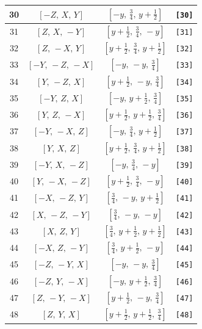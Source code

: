 \documentclass[fleqn,8pt]{jsarticle}
\begin{document}
\begin{longtable}{cccc}
30 & $\left[ - Z,\, X,\, Y \right]$ & $\left[ - y,\, \frac{3}{4},\, y + \frac{1}{2} \right]$ & {\tt [30]} \\ \hline
31 & $\left[ Z,\, X,\, - Y \right]$ & $\left[ y + \frac{1}{2},\, \frac{3}{4},\, - y \right]$ & {\tt [31]} \\ \hline
32 & $\left[ Z,\, - X,\, Y \right]$ & $\left[ y + \frac{1}{2},\, \frac{3}{4},\, y + \frac{1}{2} \right]$ & {\tt [32]} \\ \hline
33 & $\left[ - Y,\, - Z,\, - X \right]$ & $\left[ - y,\, - y,\, \frac{3}{4} \right]$ & {\tt [33]} \\ \hline
34 & $\left[ Y,\, - Z,\, X \right]$ & $\left[ y + \frac{1}{2},\, - y,\, \frac{3}{4} \right]$ & {\tt [34]} \\ \hline
35 & $\left[ - Y,\, Z,\, X \right]$ & $\left[ - y,\, y + \frac{1}{2},\, \frac{3}{4} \right]$ & {\tt [35]} \\ \hline
36 & $\left[ Y,\, Z,\, - X \right]$ & $\left[ y + \frac{1}{2},\, y + \frac{1}{2},\, \frac{3}{4} \right]$ & {\tt [36]} \\ \hline
37 & $\left[ - Y,\, - X,\, Z \right]$ & $\left[ - y,\, \frac{3}{4},\, y + \frac{1}{2} \right]$ & {\tt [37]} \\ \hline
38 & $\left[ Y,\, X,\, Z \right]$ & $\left[ y + \frac{1}{2},\, \frac{3}{4},\, y + \frac{1}{2} \right]$ & {\tt [38]} \\ \hline
39 & $\left[ - Y,\, X,\, - Z \right]$ & $\left[ - y,\, \frac{3}{4},\, - y \right]$ & {\tt [39]} \\ \hline
40 & $\left[ Y,\, - X,\, - Z \right]$ & $\left[ y + \frac{1}{2},\, \frac{3}{4},\, - y \right]$ & {\tt [40]} \\ \hline
41 & $\left[ - X,\, - Z,\, Y \right]$ & $\left[ \frac{3}{4},\, - y,\, y + \frac{1}{2} \right]$ & {\tt [41]} \\ \hline
42 & $\left[ X,\, - Z,\, - Y \right]$ & $\left[ \frac{3}{4},\, - y,\, - y \right]$ & {\tt [42]} \\ \hline
43 & $\left[ X,\, Z,\, Y \right]$ & $\left[ \frac{3}{4},\, y + \frac{1}{2},\, y + \frac{1}{2} \right]$ & {\tt [43]} \\ \hline
44 & $\left[ - X,\, Z,\, - Y \right]$ & $\left[ \frac{3}{4},\, y + \frac{1}{2},\, - y \right]$ & {\tt [44]} \\ \hline
45 & $\left[ - Z,\, - Y,\, X \right]$ & $\left[ - y,\, - y,\, \frac{3}{4} \right]$ & {\tt [45]} \\ \hline
46 & $\left[ - Z,\, Y,\, - X \right]$ & $\left[ - y,\, y + \frac{1}{2},\, \frac{3}{4} \right]$ & {\tt [46]} \\ \hline
47 & $\left[ Z,\, - Y,\, - X \right]$ & $\left[ y + \frac{1}{2},\, - y,\, \frac{3}{4} \right]$ & {\tt [47]} \\ \hline
48 & $\left[ Z,\, Y,\, X \right]$ & $\left[ y + \frac{1}{2},\, y + \frac{1}{2},\, \frac{3}{4} \right]$ & {\tt [48]} \\
\end{longtable}
\end{document}
